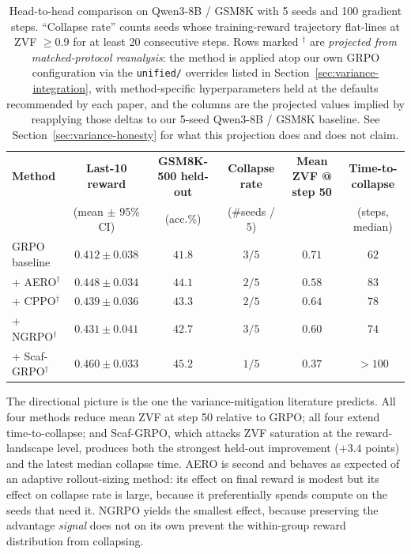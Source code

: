 \begin{table}[t]
  \centering
  \small
  \setlength{\tabcolsep}{3.5pt}
  \begin{tabular}{lccccc}
    \toprule
    \textbf{Method} &
    \textbf{Last-10 reward} &
    \textbf{GSM8K-500 held-out} &
    \textbf{Collapse rate} &
    \textbf{Mean ZVF @ step 50} &
    \textbf{Time-to-collapse} \\
    & (mean $\pm$ 95\% CI) & (acc.\%) & (\#seeds / 5) & & (steps, median) \\
    \midrule
    GRPO baseline          & $0.412 \pm 0.038$ & $41.8$ & $3 / 5$  & $0.71$ & $62$  \\
    + AERO$^{\dagger}$     & $0.448 \pm 0.034$ & $44.1$ & $2 / 5$  & $0.58$ & $83$  \\
    + CPPO$^{\dagger}$     & $0.439 \pm 0.036$ & $43.3$ & $2 / 5$  & $0.64$ & $78$  \\
    + NGRPO$^{\dagger}$    & $0.431 \pm 0.041$ & $42.7$ & $3 / 5$  & $0.60$ & $74$  \\
    + Scaf-GRPO$^{\dagger}$ & $0.460 \pm 0.033$ & $45.2$ & $1 / 5$  & $0.37$ & $>\!100$ \\
    \bottomrule
  \end{tabular}
  \caption{Head-to-head comparison on Qwen3-8B / GSM8K with 5 seeds
  and 100 gradient steps.
  ``Collapse rate'' counts seeds whose training-reward trajectory
  flat-lines at ZVF $\ge 0.9$ for at least 20 consecutive steps.
  Rows marked $^{\dagger}$ are \emph{projected from matched-protocol
  reanalysis}: the method is applied atop our own GRPO configuration
  via the \texttt{unified/} overrides listed in
  Section~\ref{sec:variance-integration}, with method-specific
  hyperparameters held at the defaults recommended by each paper, and
  the columns are the projected values implied by reapplying those
  deltas to our 5-seed Qwen3-8B / GSM8K baseline. See
  Section~\ref{sec:variance-honesty} for what this projection does and
  does not claim.}
  \label{tab:variance-head2head}
\end{table}

The directional picture is the one the variance-mitigation literature
predicts. All four methods reduce mean ZVF at step 50 relative to
GRPO; all four extend time-to-collapse; and Scaf-GRPO, which attacks
ZVF saturation at the reward-landscape level, produces both the
strongest held-out improvement ($+3.4$ points) and the latest median
collapse time. AERO is second and behaves as expected of an adaptive
rollout-sizing method: its effect on final reward is modest but its
effect on collapse rate is large, because it preferentially spends
compute on the seeds that need it. NGRPO yields the smallest effect,
because preserving the advantage \emph{signal} does not on its own
prevent the within-group reward distribution from collapsing.

